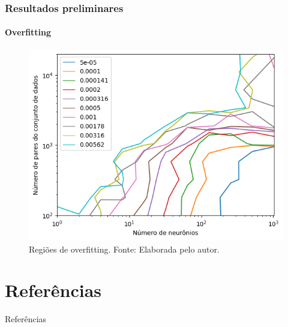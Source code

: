 \documentclass[aspectratio=169]{beamer}
\newcommand{\fautor}{Fonte: Elaborada pelo autor.}
\begin{document}
\begin{frame}
\frametitle{Resultados preliminares}
\framesubtitle{Overfitting}

\begin{figure}[H]
    \centering
    \includegraphics[width=0.6\columnwidth]{overfit.png}
    \caption{Regiões de overfitting. \fautor}
\end{figure}

\end{frame}
\section{Referências}


\begin{frame}[allowframebreaks]{Referências}

\end{frame}

\end{document}
